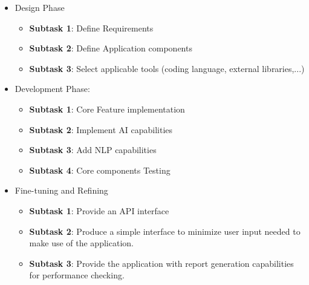 \documentclass[a4paper, 11pt]{report}
\begin{document}
\begin{itemize}

\item  Design Phase
\begin{itemize}
\item  \textbf{Subtask 1}: Define Requirements
\item  \textbf{Subtask 2}: Define Application components
\item  \textbf{Subtask 3}: Select applicable tools (coding language, external libraries,...)
\end{itemize}

\item  Development Phase:
\begin{itemize}
\item  \textbf{Subtask 1}: Core Feature implementation
\item  \textbf{Subtask 2}: Implement AI capabilities
\item  \textbf{Subtask 3}: Add NLP capabilities
\item  \textbf{Subtask 4}: Core components Testing
\end{itemize}

\item Fine-tuning and Refining
\begin{itemize}
\item  \textbf{Subtask 1}: Provide an API interface
\item  \textbf{Subtask 2}: Produce a simple interface to minimize user input needed to make use of the application.
\item  \textbf{Subtask 3}: Provide the application with report generation capabilities for performance checking.
\end{itemize}


\end{itemize}
\end{document}
